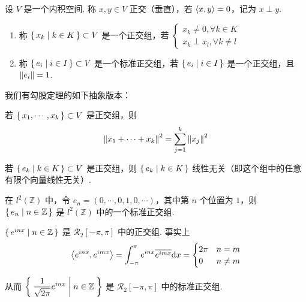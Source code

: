 
\begin{definition}
    设 $V$ 是一个内积空间. 称 $x,y\in V$ 正交（垂直），若 $\left\langle{x,y}\right\rangle=0$，记为 $x\perp y$.
\end{definition}

\begin{definition}    
    \begin{enumerate}
        \item 称 $\set{x_k|k\in K}\subset V$ 是一个正交组，若 $\begin{cases}
            x_k\ne 0,\forall k\in K\\
            x_k\perp x_l,\forall k\ne l
        \end{cases}$

        \item 称 $\set{e_i|i\in I}\subset V$ 是一个标准正交组，若 $\set{e_i|i\in I}$ 是一个正交组，且 $\left\lVert{e_i}\right\rVert=1$.
    \end{enumerate}
\end{definition}

我们有勾股定理的如下抽象版本：

\begin{property}
    若 $\set{x_1,\cdots,x_k}\subset V$ 是正交组，则
$$
\left\lVert{x_1+\cdots+x_k}\right\rVert^2=\sum_{j=1}^k\left\lVert{x_j}\right\rVert^2
$$
\end{property}

\begin{property}
    若 $\set{e_k|k\in K}\subset V$ 是正交组，则 $\set{e_k|k\in K}$ 线性无关（即这个组中的任意有限个向量线性无关）.
\end{property}

\begin{example}
    在 $l^2(\mathbb{Z})$ 中，令 $e_n=(0,\cdots,0,1,0,\cdots)$，其中第 $n$ 个位置为 $1$，则 $\set{e_n|n\in\mathbb{Z}}$ 是 $l^2(\mathbb{Z})$ 中的一个标准正交组.
\end{example}

\begin{example}
    $\set{e^{inx}|n\in\mathbb{Z}}$ 是 $\mathcal{R}_2[-\pi,\pi]$ 中的正交组. 事实上
$$
\left\langle{e^{inx},e^{imx}}\right\rangle=\int_{-\pi}^{\pi}e^{inx}\overline{e^{imx}}\mathrm{d} x=\begin{cases}
    2\pi & n=m\\
    0 & n\ne m
\end{cases}
$$

    从而 $\displaystyle\Set{\frac{1}{\sqrt{2\pi}}e^{inx}|n\in\mathbb{Z}}$ 是 $\mathcal{R}_2[-\pi,\pi]$ 中的标准正交组.
\end{example}

